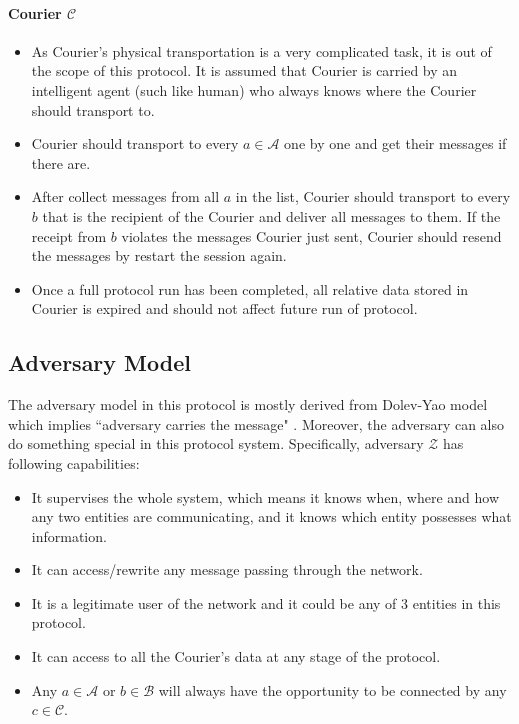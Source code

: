 \documentclass[10pt,a4paper]{article}
\begin{document}
\paragraph{Courier $\mathcal{C}$}
\begin{itemize}
\item As Courier's physical transportation is a very complicated task, it is out of the scope of this protocol. It is assumed that Courier is carried by an intelligent agent (such like human) who always knows where the Courier should transport to.

\item Courier should transport to every $a \in \mathcal{A}$ one by one and get their messages if there are.

\item After collect messages from all $a$ in the list, Courier should transport to every $b$ that is the recipient of the Courier and deliver all messages to them. If the receipt from $b$ violates the messages Courier just sent, Courier should resend the messages by restart the session again.

\item Once a full protocol run has been completed, all relative data stored in Courier is expired and should not affect future run of protocol.
\end{itemize}

\subsection*{Adversary Model}
The adversary model in this protocol is mostly derived from Dolev-Yao model which implies ``adversary carries the message" \cite{dolev}. Moreover, the adversary can also do something special in this protocol system. Specifically, adversary $\mathcal{Z}$ has following capabilities:
\begin{itemize}
\item It supervises the whole system, which means it knows when, where and how any two entities are communicating, and it knows which entity possesses what information.
\item It can access/rewrite any message passing through the network.
\item It is a legitimate user of the network and it could be any of 3 entities in this protocol.
\item It can access to all the Courier's data at any stage of the protocol.
\item Any $a \in \mathcal{A}$ or $b \in \mathcal{B}$ will always have the opportunity to be connected by any $c \in \mathcal{C}$.
\end{itemize}
\end{document}
